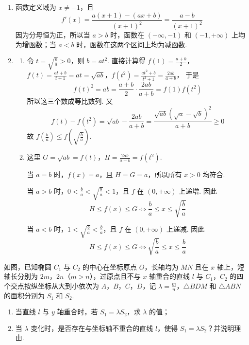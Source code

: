 \begin{solution}
\begin{enumerate}
\item 函数定义域为 \(x\ne-1\)，且
\[
 f'(x)=\frac{a(x+1)-(ax+b)}{(x+1)^2}=\frac{a-b}{(x+1)^2}
\]
因为分母恒为正，所以当 \(a>b\) 时，函数在 \((-\infty,-1)\) 和 \((-1,+\infty)\) 上均为增函数；当 \(a<b\) 时，函数在这两个区间上均为减函数.

\item
\begin{enumerate}
\item 令 \(t=\sqrt{\frac ba}>0\)，则 \(b=at^2\). 直接计算得
\(f(1)=\frac{a+b}{2}\)，\(f(t)=\frac{at+b}{t+1}=at=\sqrt{ab}\)，\(f(t^2)=\frac{at^2+b}{t^2+1}=\frac{2ab}{a+b}\)，
于是
\[
 f(t)^2=ab=\frac{a+b}{2}\cdot\frac{2ab}{a+b}=f(1)f(t^2)
\]
所以这三个数成等比数列. 又
\[
 f(t)-f(t^2)=\sqrt{ab}-\frac{2ab}{a+b}
 =\frac{\sqrt{ab}\left(\sqrt a-\sqrt b\right)^2}{a+b}\geqslant0
\]
故 \(f\left(\frac ba\right)\leqslant f\left(\sqrt{\frac ba}\right)\).

\item 这里 \(G=\sqrt{ab}=f(t)\)，\(H=\frac{2ab}{a+b}=f(t^2)\).

当 \(a=b\) 时，\(f(x)=a\)，且 \(H=G=a\)，所以所有 \(x>0\) 均符合.

当 \(a>b\) 时，\(0<\frac ba<\sqrt{\frac ba}<1\)，且 \(f\) 在 \((0,+\infty)\) 上递增. 因此
\[
 H\leqslant f(x)\leqslant G
 \iff \frac ba\leqslant x\leqslant\sqrt{\frac ba}
\]

当 \(a<b\) 时，\(1<\sqrt{\frac ba}<\frac ba\)，且 \(f\) 在 \((0,+\infty)\) 上递减. 因此
\[
 H\leqslant f(x)\leqslant G
 \iff \sqrt{\frac ba}\leqslant x\leqslant\frac ba
\]
\end{enumerate}
\end{enumerate}
\end{solution}

\begin{problem}
如图，已知椭圆 \(C_1\) 与 \(C_2\) 的中心在坐标原点 \(O\)，长轴均为 \(MN\) 且在 \(x\) 轴上，短轴长分别为 \(2m\)，\(2n\)（\(m>n\)），过原点且不与 \(x\) 轴重合的直线 \(l\) 与 \(C_1\)，\(C_2\) 的四个交点按纵坐标从大到小依次为 \(A\)，\(B\)，\(C\)，\(D\)，记 \(\lambda=\frac{m}{n}\)，\(\triangle BDM\) 和 \(\triangle ABN\) 的面积分别为 \(S_1\) 和 \(S_2\).

\begin{enumerate}
\item 当直线 \(l\) 与 \(y\) 轴重合时，若 \(S_1=\lambda S_2\)，求 \(\lambda\) 的值；
\item 当 \(\lambda\) 变化时，是否存在与坐标轴不重合的直线 \(l\)，使得 \(S_1=\lambda S_2\)？并说明理由.
\end{enumerate}

\end{problem}

